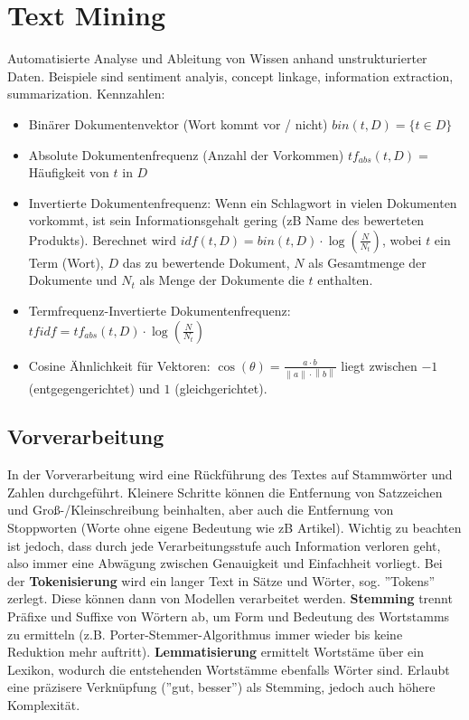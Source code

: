 \documentclass{article}
\begin{document}
\section{Text Mining}
Automatisierte Analyse und Ableitung von Wissen anhand unstrukturierter Daten. Beispiele sind sentiment analyis, concept linkage, information extraction, summarization.
Kennzahlen:
\begin{itemize}
    \item Binärer Dokumentenvektor (Wort kommt vor / nicht) $bin(t,D) = \{t \in D\}$
    \item Absolute Dokumentenfrequenz (Anzahl der Vorkommen) $tf_{abs}(t,D) = $ Häufigkeit von $t$ in $D$ 
    \item Invertierte Dokumentenfrequenz: Wenn ein Schlagwort in vielen Dokumenten vorkommt, ist sein Informationsgehalt gering (zB Name des bewerteten Produkts).
        Berechnet wird $idf(t,D) = bin(t,D) \cdot \log(\frac{N}{N_{t}})$, wobei $t$ ein Term (Wort), $D$ das zu bewertende Dokument, $N$ als Gesamtmenge der Dokumente und
        $N_{t}$ als Menge der Dokumente die $t$ enthalten.
    \item Termfrequenz-Invertierte Dokumentenfrequenz: $tfidf = tf_{abs}(t,D) \cdot \log(\frac{N}{N_{t}})$
    \item Cosine Ähnlichkeit für Vektoren: $ \cos(\theta) = \frac{a \cdot b}{ \left\lVert a\right\rVert \cdot \left\lVert b \right\rVert } $
        liegt zwischen $-1$ (entgegengerichtet) und $1$ (gleichgerichtet).
\end{itemize}

\subsection{Vorverarbeitung}
In der Vorverarbeitung wird eine Rückführung des Textes auf Stammwörter und Zahlen durchgeführt.
Kleinere Schritte können die Entfernung von Satzzeichen und Groß-/Kleinschreibung beinhalten, aber auch die Entfernung von Stoppworten (Worte ohne eigene Bedeutung wie zB Artikel).
Wichtig zu beachten ist jedoch, dass durch jede Verarbeitungsstufe auch Information verloren geht, also immer eine Abwägung zwischen Genauigkeit und Einfachheit vorliegt.
Bei der \textbf{Tokenisierung} wird ein langer Text in Sätze und Wörter, sog. ''Tokens'' zerlegt. Diese können dann von Modellen verarbeitet werden.
\textbf{Stemming} trennt Präfixe und Suffixe von Wörtern ab, um Form und Bedeutung des Wortstamms zu ermitteln (z.B. Porter-Stemmer-Algorithmus immer wieder bis keine Reduktion mehr auftritt).
\textbf{Lemmatisierung} ermittelt Wortstäme über ein Lexikon, wodurch die entstehenden Wortstämme ebenfalls Wörter sind. 
Erlaubt eine präzisere Verknüpfung (''gut, besser'') als Stemming, jedoch auch höhere Komplexität.
\end{document}
